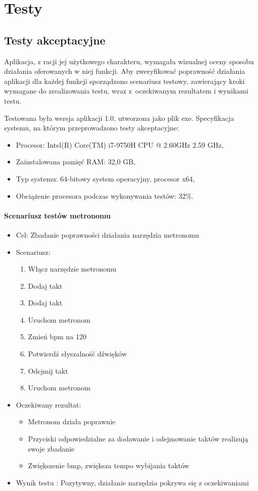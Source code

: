 \chapter{Testy}
\section{Testy akceptacyjne}
Aplikacja, z racji jej użytkowego charakteru, wymagała wizualnej oceny sposobu działania oferowanych w niej funkcji.
Aby zweryfikować poprawność działania aplikacji dla każdej funkcji sporządzono scenariusz testowy, zawierający kroki wymagane do zrealizowania testu, wraz z~oczekiwanym rezultatem i wynikami testu.

Testowana była wersja aplikacji 1.0, utworzona jako plik exe. 
Specyfikacja systemu, na którym przeprowadzono testy akceptacyjne:
\begin{itemize}
    \item Procesor: Intel(R) Core(TM) i7-9750H CPU @ 2.60GHz 2.59 GHz, 
    \item Zainstalowana pamięć RAM: 32,0 GB,
    \item Typ systemu: 64-bitowy system operacyjny, procesor x64,
    \item Obciążenie procesora podczas wykonywania testów: 32\%.
\end{itemize}

\subsubsection{Scenariusz testów metronomu}

\begin{itemize}
    \item Cel: Zbadanie poprawności działania narzędzia metronomu
    \item Scenariusz:
        \begin{enumerate}
            \item Włącz narzędzie metronomu
            \item Dodaj takt 
            \item Dodaj takt
            \item Uruchom metronom
            \item Zmień bpm na 120
            \item Potwierdź słyszalność dźwięków
            \item Odejmij takt
            \item Uruchom metronom
        \end{enumerate}
    \item Oczekiwany rezultat:
        \begin{itemize}
            \item Metronom działa poprawnie
            \item Przyciski odpowiedzialne za dodawanie i odejmowanie taktów realizują swoje zbadanie
            \item Zwiększenie bmp, zwiększa tempo wybijania taktów
        \end{itemize}
    \item Wynik testu : Pozytywny, działanie narzędzia pokrywa się z oczekiwaniami
\end{itemize}

